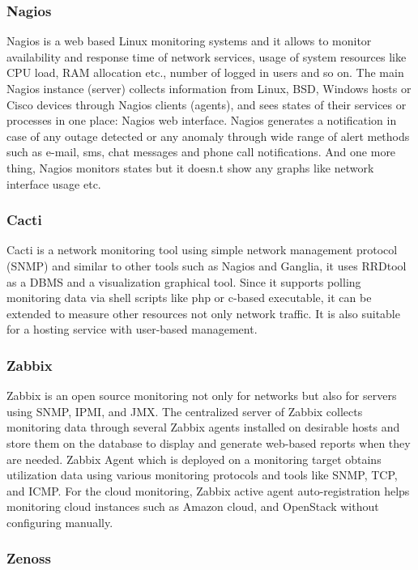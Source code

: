 \documentclass{sig-alternate-05-2015}
\begin{document}
\subsubsection{Nagios}

Nagios is a web based Linux monitoring systems and it allows to monitor availability and response time of network services, usage of system resources like CPU load, RAM allocation etc., number of logged in users and so on. The main Nagios instance (server) collects information from Linux, BSD, Windows hosts or Cisco devices through Nagios clients (agents), and sees states of their services or processes in one place: Nagios web interface. Nagios generates a notification in case of any outage detected or any anomaly through wide range of alert methods such as e-mail, sms, chat messages and phone call notifications. And one more thing, Nagios monitors states but it doesn.t show any graphs like network interface usage etc.

\subsubsection{Cacti}
Cacti is a network monitoring tool using simple network management protocol (SNMP) and similar to other tools such as Nagios and Ganglia, it uses RRDtool as a DBMS and a visualization graphical tool. Since it supports polling monitoring data via shell scripts like php or c-based executable, it can be extended to measure other resources not only network traffic. It is also suitable for a hosting service with user-based management.

\subsubsection{Zabbix}

Zabbix is an open source monitoring not only for networks but also for servers using SNMP, IPMI, and JMX. The centralized server of Zabbix collects monitoring data through several Zabbix agents installed on desirable hosts and store them on the database to display and generate web-based reports when they are needed. Zabbix Agent which is deployed on a monitoring target obtains utilization data using various monitoring protocols and tools like SNMP, TCP, and ICMP. For the cloud monitoring, Zabbix active agent auto-registration helps monitoring cloud instances such as Amazon cloud, and OpenStack without configuring manually.

\subsubsection{Zenoss}
\end{document}

